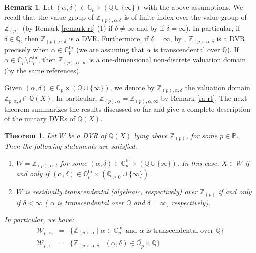 \documentclass[10pt]{article}
\numberwithin{equation}{section}
\newtheorem{Thm}[equation]{Theorem}
\theoremstyle{definition}
\newtheorem{Rem}[equation]{Remark}
\theoremstyle{definition}
\newcommand{\Q}{\mathbb{Q}}
\newcommand{\Z}{\mathbb{Z}}
\newcommand{\C}{\mathbb{C}}
\renewcommand{\O}{\mathbb{O}}
\newcommand{\PP}{\mathbb{P}}
\newcommand{\oQp}{\overline{\Q_p}}
\newcommand{\ra}{\text{ra}}
\newcommand{\rt}{\text{rt}}
\newcommand{\br}{\text{br}}
\begin{document}
\begin{Rem} \label{remark35}
Let $(\alpha,\delta)\in\C_p\times(\Q\cup\{\infty\})$ with the above assumptions. We recall that the value group of $\Z_{(p),\alpha,\delta}$ is of finite index over the value group of $\Z_{(p)}$ (by Remark \ref{remark rt} (1) if $\delta\not=\infty$ and by \cite[Proposition 2.2]{PerTransc}  if $\delta=\infty$). In particular, if $\delta\in\Q$, then $\Z_{(p),\alpha,\delta}$ is a DVR. Furthermore, if $\delta=\infty$, by \cite[Proposition 2.14, Remark 2.18, Corollary 2.28]{PerStacked}, $\Z_{(p),\alpha,\delta}$ is a DVR precisely when $\alpha\in\C_p^{\br}$ (we are assuming that $\alpha$ is transcendental over $\Q$). If $\alpha\in\C_p\setminus\C_p^{\br}$, then $\Z_{(p),\alpha,\infty}$ is a one-dimensional non-discrete valuation domain (by the same references).
\end{Rem}


Given $(\alpha,\delta)\in\C_p\times(\Q\cup\{\infty\})$, we denote by $\Z_{(p),\alpha,\delta}$ the valuation domain $\Z_{p,\alpha,\delta}\cap\Q(X)$. In particular,  $\Z_{(p),\alpha}=\Z_{(p),\alpha,\infty}$ by Remark \ref{ra rt}.
The next theorem summarizes the results discussed so far and give a complete description of the unitary DVRs of $\Q(X)$.

\begin{Thm}\label{unitary DVRs over Z(p)}
Let $W$ be a DVR of $\Q(X)$ lying above $\Z_{(p)}$, for some $p\in\PP$. Then
the following statements are satisfied.
\begin{enumerate}
\item[{\em (1)}] $W=\Z_{(p),\alpha,\delta}$ for some $(\alpha,\delta)\in\C_p^{\br}\times(\Q\cup\{\infty\})$. In this case, $X\in W$ if and only if $(\alpha,\delta)\in\O_p^{\br}\times(\Q_{\geq0}\cup\{\infty\})$.
\item[{\em (2)}] $W$ is residually transcendental (algebraic, respectively) over $\Z_{(p)}$ 
if and only if $\delta<\infty$ ( $\alpha$ is transcendental over $\Q$ and $\delta=\infty$, respectively).
\end{enumerate}
In particular, we have:
\begin{eqnarray*}
    \mathcal W_{p,\ra} &= &\{\Z_{(p),\alpha} \mid\alpha \in \C_{p}^{\br} \text{ and }\alpha \text{ is transcendental over }\Q\}\\
    \mathcal W_{p,\rt}  &= &\{\Z_{(p),\alpha,\delta}\mid (\alpha, \delta)\in\oQp\times\Q\}
\end{eqnarray*}
\end{Thm}
\end{document}

